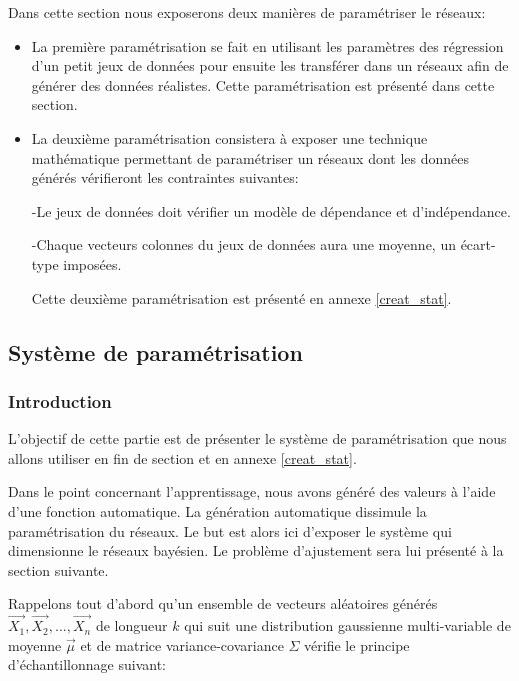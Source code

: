 \documentclass[a4paper]{article}
\begin{document}
\begin{enumerate}
Dans cette section nous exposerons deux manières  de paramétriser le réseaux:

\begin{itemize}
\item La première paramétrisation se fait en utilisant les paramètres des régression d'un petit jeux de données pour ensuite les transférer dans un réseaux afin de générer des données réalistes. Cette paramétrisation est présenté dans cette section.

\item La deuxième paramétrisation consistera à exposer une technique mathématique permettant de paramétriser un réseaux dont les données générés vérifieront les contraintes suivantes:
 

-Le jeux de données doit vérifier un modèle de dépendance et d'indépendance.

-Chaque vecteurs colonnes du jeux de données aura une moyenne, un écart-type imposées.



Cette deuxième paramétrisation est présenté en annexe \ref{creat_stat}.
\end{itemize}

\end{enumerate}
\newpage
\subsection{Système de paramétrisation }

\subsubsection{Introduction}
L'objectif de cette  partie est de présenter le système de paramétrisation que nous allons utiliser en fin de section et en annexe \ref{creat_stat}.

Dans le point concernant l'apprentissage,  nous avons  généré des valeurs à l'aide d'une fonction automatique. La génération automatique dissimule la paramétrisation du réseaux. Le but est alors ici d'exposer  le système qui dimensionne le réseaux bayésien. Le problème d'ajustement sera lui présenté à la section suivante.



Rappelons tout d'abord qu'un ensemble de vecteurs aléatoires générés $\vec{X_{1}},\vec{X_{2}},...,\vec{X_{n}}$ de longueur $k$ qui suit une distribution gaussienne multi-variable de moyenne $\vec{\mu}$ et de matrice variance-covariance $\Sigma$ vérifie le principe d'échantillonnage suivant:
\end{document}
